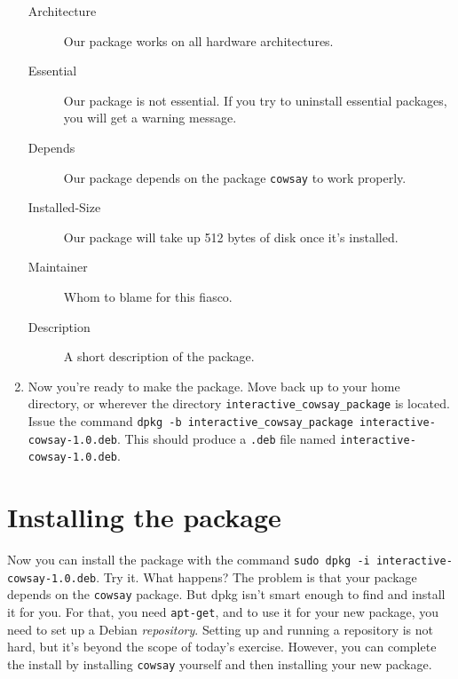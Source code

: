 \documentclass{article}
\begin{document}
\begin{enumerate}
\begin{description}
			\item[Architecture]Our package works on all hardware architectures.

			\item[Essential]Our package is not essential. If you try to uninstall essential packages, you will get a warning message.

			\item[Depends]Our package depends on the package \texttt{cowsay} to work properly.
				
			\item[Installed-Size]Our package will take up 512 bytes of disk once it's installed.

			\item[Maintainer]Whom to blame for this fiasco.

			\item[Description]A short description of the package.
		\end{description}
	\item Now you're ready to make the package. Move back up to your home directory, or wherever the directory \texttt{interactive\_cowsay\_package} is located. Issue the command \texttt{dpkg -b interactive\_cowsay\_package interactive-cowsay-1.0.deb}. This should produce a \texttt{.deb} file named \texttt{interactive-cowsay-1.0.deb}.
	\end{enumerate}
	\section{Installing the package}
	Now you can install the package with the command \texttt{sudo dpkg -i interactive-cowsay-1.0.deb}. Try it.
		What happens?
		The problem is that your package depends on the \texttt{cowsay} package. But dpkg isn't smart enough to find and install it for you. For that, you need \texttt{apt-get}, and to use it for your new package, you need to set up a Debian \emph{repository}. Setting up and running a repository is not hard, but it's beyond the scope of today's exercise.  However, you can complete the install by installing \texttt{cowsay} yourself and then installing your new package.
\end{document}
